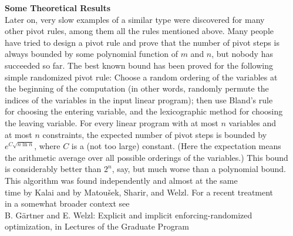 \documentclass{article}%
\begin{document}
\textbf{Some Theoretical Results} \\
Later on, very slow examples of a similar type were discovered for many \\
other pivot rules, among them all the rules mentioned above. Many people \\
have tried to design a pivot rule and prove that the number of pivot steps is \\
always bounded by some polynomial function of $m$ and $n$, but nobody has \\
succeeded so far. The best known bound has been proved for the following \\
simple randomized pivot rule: Choose a random ordering of the variables at \\
the beginning of the computation (in other words, randomly permute the \\
indices of the variables in the input linear program); then use Bland's rule \\
for choosing the entering variable, and the lexicographic method for choosing \\
the leaving variable. For every linear program with at most $n$ variables and \\
at most $n$ constraints, the expected number of pivot steps is bounded by \\
$e^{C\sqrt{n \ln n}}$, where $C$ is a (not too large) constant. (Here the expectation means \\
the arithmetic average over all possible orderings of the variables.) This bound \\
is considerably better than $2^n$, say, but much worse than a polynomial bound. \\
This algorithm was found independently and almost at the same \\
time by Kalai and by Matoušek, Sharir, and Welzl. For a recent treatment \\
in a somewhat broader context see \\
B. Gärtner and E. Welzl: Explicit and implicit enforcing-randomized \\
optimization, in Lectures of the Graduate Program
%
\end{document}
